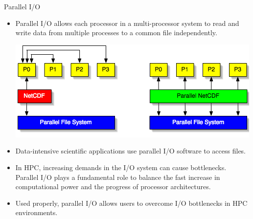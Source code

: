 \documentclass[compress,11pt,xcolor=svgnames,aspectratio=169]{beamer}
\begin{document}
\begin{frame}[fragile] {Parallel I/O}

\begin{itemize}
\setlength\itemsep{0.1cm}

  \item Parallel I/O allows each processor in a multi-processor system to read and write data from multiple processes to a common file independently.

  \begin{center}
  \includegraphics[scale=0.5]{fig/pnetcdf}
  \end{center}

  \item Data-intensive scientific applications use parallel I/O software to access files.

  \item In HPC, increasing demands in the I/O system can cause bottlenecks. Parallel I/O plays a fundamental role to balance the fast increase in computational power and the progress of processor architectures.

  \item Used properly, parallel I/O allows users to overcome I/O bottlenecks in HPC environments.

\end{itemize}

\end{frame}
\end{document}
